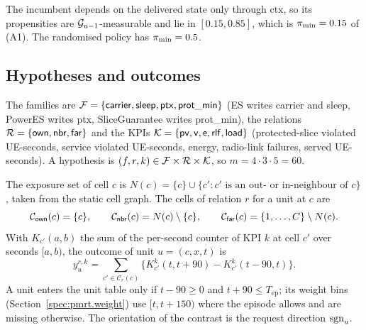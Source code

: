 \noindent The incumbent depends on the delivered state only through $\mathrm{ctx}$, so its propensities are $\mathcal{G}_{u-1}$-measurable and lie in $[0.15, 0.85]$, which is $\pi_{\min} = 0.15$ of (A1). The randomised policy has $\pi_{\min} = 0.5$.


\subsection{Hypotheses and outcomes}
\label{spec:sys.hyp}

The families are $\mathcal{F} = \{\mathsf{carrier}, \mathsf{sleep}, \mathsf{ptx}, \mathsf{prot\_min}\}$ (ES writes carrier and sleep, PowerES writes ptx, SliceGuarantee writes prot\_min), the relations $\mathcal{R} = \{\mathsf{own}, \mathsf{nbr}, \mathsf{far}\}$ and the KPIs $\mathcal{K} = \{\mathsf{pv}, \mathsf{v}, \mathsf{e}, \mathsf{rlf}, \mathsf{load}\}$ (protected-slice violated UE-seconds, service violated UE-seconds, energy, radio-link failures, served UE-seconds). A hypothesis is $(f, r, k) \in \mathcal{F} \times \mathcal{R} \times \mathcal{K}$, so $m = 4 \cdot 3 \cdot 5 = 60$.

The exposure set of cell $c$ is $N(c) = \{c\} \cup \{c' : c' \text{ is an out- or in-neighbour of } c\}$, taken from the static cell graph. The cells of relation $r$ for a unit at $c$ are
\begin{equation*}
\mathcal{C}_{\mathsf{own}}(c) = \{c\}, \qquad \mathcal{C}_{\mathsf{nbr}}(c) = N(c) \setminus \{c\}, \qquad \mathcal{C}_{\mathsf{far}}(c) = \{1, \dots, C\} \setminus N(c).
\end{equation*}
With $K_{c'}(a, b)$ the sum of the per-second counter of KPI $k$ at cell $c'$ over seconds $[a, b)$, the outcome of unit $u = (c, x, t)$ is
\begin{equation*}
y_u^{r,k} = \sum_{c' \in \mathcal{C}_r(c)} \bigl\{ K_{c'}^{k}(t, t + 90) - K_{c'}^{k}(t - 90, t) \bigr\}.
\end{equation*}
A unit enters the unit table only if $t - 90 \ge 0$ and $t + 90 \le T_{\mathrm{ep}}$; its weight bins (Section~\ref{spec:pmrt.weight}) use $[t, t + 150)$ where the episode allows and are missing otherwise. The orientation of the contrast is the request direction $\mathrm{sgn}_u$.


